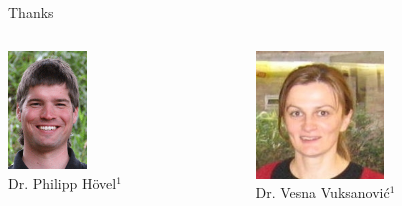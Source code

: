 \documentclass{beamer}
\begin{document}
\begin{frame}{Thanks}
  \begin{columns}[T] %
     \begin{column}[T]{4cm} %
     \centering
	\includegraphics[width=0.35\textwidth]{Figures/philipphoevelimage.png}\\
     Dr. Philipp H\"{o}vel$^1$ \\
     \break
     \end{column}
     
	     
     
     \begin{column}[T]{4cm}   
     \centering
    \includegraphics[width=0.5\textwidth]{Figures/vesna.jpg} \\
     Dr. Vesna Vuksanovi\'c$^1$ \\
     \end{column}



\end{columns}
\end{frame}
\end{document}
